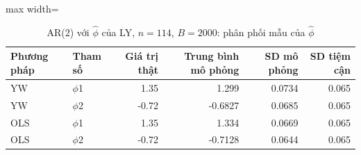 \begin{table}[H]
\centering\small
\caption{AR(2) với $\hat\phi$ của LY, $n=114$, $B=2000$: phân phối mẫu của $\hat\phi$}\label{tab:tab_b11_12_simulation}
\begin{adjustbox}{max width=\linewidth}
\begin{tabular}{llrrrr}
\toprule
Phương pháp & Tham số & Giá trị thật & Trung bình mô phỏng & SD mô phỏng & SD tiệm cận \\
\midrule
YW & $\phi$1 & 1.35 & 1.299 & 0.0734 & 0.065 \\
YW & $\phi$2 & -0.72 & -0.6827 & 0.0685 & 0.065 \\
OLS & $\phi$1 & 1.35 & 1.334 & 0.0669 & 0.065 \\
OLS & $\phi$2 & -0.72 & -0.7128 & 0.0644 & 0.065 \\
\bottomrule
\end{tabular}
\end{adjustbox}
\end{table}

